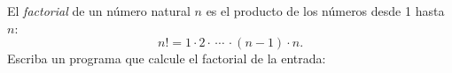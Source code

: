 El \emph{factorial} de un número natural \(n\)
es el producto de los números desde 1 hasta \(n\):
\[ n! = 1\cdot 2\cdot\,\cdots\, \cdot(n - 1)\cdot n. \]
Escriba un programa que calcule el factorial de la entrada:

\begin{minipage}[t]{.20\textwidth}
  
\end{minipage}
\quad
\begin{minipage}[t]{.20\textwidth}
  
\end{minipage}
\quad
\begin{minipage}[t]{.20\textwidth}
  
\end{minipage}
